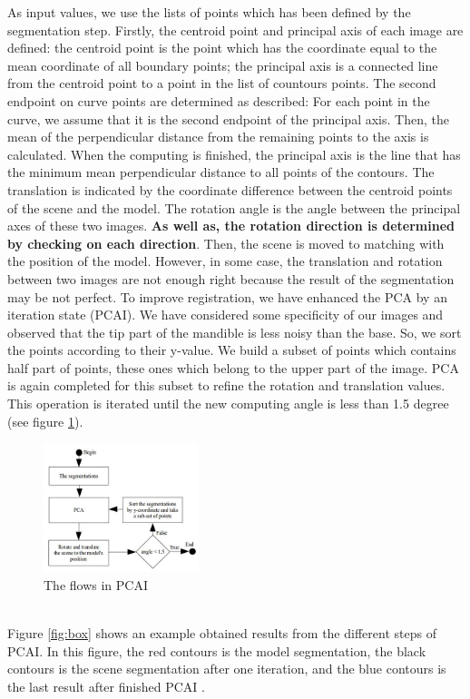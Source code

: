 \documentclass[twoside,twocolumn,10pt]{article}
\begin{document}
As input values, we use the lists of points which has been defined by the segmentation step. Firstly, the centroid point and principal axis of each image are defined: the centroid point is the point which has the coordinate equal to the mean coordinate of all boundary points; the principal axis is a connected line from the centroid point to a point in the list of countours points. The second endpoint on curve points are determined as described: For each point in the curve, we assume that it is the second endpoint of the principal axis. Then, the mean of the perpendicular distance from the remaining points to the axis is calculated. When the computing is finished, the principal axis is the line that has the minimum mean perpendicular distance to all points of the contours. The translation is indicated by the coordinate difference between the centroid points of the scene and the model. The rotation angle is the angle between the principal axes of these two images. \textbf{As well as, the rotation direction is determined by checking on each direction}. Then, the scene is moved to matching with the position of the model. However,
in some case, the translation and rotation between two images are
not enough right because the result of the segmentation may be not perfect. To improve registration, we have enhanced the PCA by an iteration state (PCAI). We have considered some specificity of our images and observed that the tip part of the mandible is less noisy than the base. So, we sort the points according to their y-value. We build a subset of points which contains half part of points, these ones which belong to the upper part of the image. PCA is again completed for this subset to refine the rotation and translation values. This operation is iterated until the new computing angle is less than 1.5 degree (see figure \ref{fig:pcai}).
\begin{figure}[htb]
    \centering
    \includegraphics[width=0.4\textwidth]{./images/pcadiagram}
    \caption{The flows in PCAI}
    \label{fig:pcai}
\end{figure}~\\
Figure \ref{fig:box} shows an example obtained results from the different steps of PCAI. In this figure, the red contours is the model segmentation, the black contours is the scene segmentation after one iteration, and the blue contours is the last result after finished PCAI .\\
\end{document}
